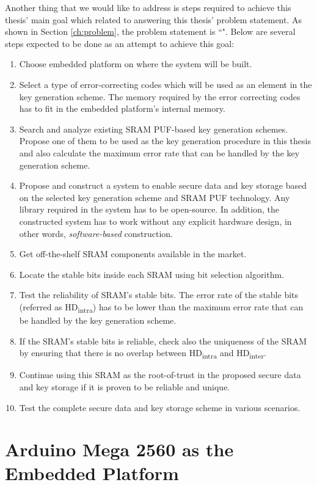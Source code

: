 Another thing that we would like to address is steps required to achieve this thesis' main goal which related to answering this thesis' problem statement. As shown in Section \ref{ch:problem}, the problem statement is ``\problemStatement".
Below are several steps expected to be done as an attempt to achieve this goal:
\begin{enumerate}
  \item Choose embedded platform on where the system will be built.
  \item Select a type of error-correcting codes which will be used as an element in the key generation scheme. The memory required by the error correcting codes has to fit in the embedded platform's internal memory.
  \item Search and analyze existing SRAM PUF-based key generation schemes. Propose one of them to be used as the key generation procedure in this thesis and also calculate the maximum error rate that can be handled by the key generation scheme.
  \item Propose and construct a system to enable secure data and key storage based on the selected key generation scheme and SRAM PUF technology. Any library required in the system has to be open-source. In addition, the constructed system has to work without any explicit hardware design, in other words, \textit{software-based} construction.
  \item Get off-the-shelf SRAM components available in the market.
  \item Locate the stable bits inside each SRAM using bit selection algorithm.
  \item Test the reliability of SRAM's stable bits. The error rate of the stable bits (referred as HD\textsubscript{intra}) has to be lower than the maximum error rate that can be handled by the key generation scheme.
  \item If the SRAM's stable bits is reliable, check also the uniqueness of the SRAM by ensuring that there is no overlap between HD\textsubscript{intra} and HD\textsubscript{inter}.
  \item Continue using this SRAM as the root-of-trust in the proposed secure data and key storage if it is proven to be reliable and unique.
  \item Test the complete secure data and key storage scheme in various scenarios.
\end{enumerate}

\section{Arduino Mega 2560 as the Embedded Platform}

